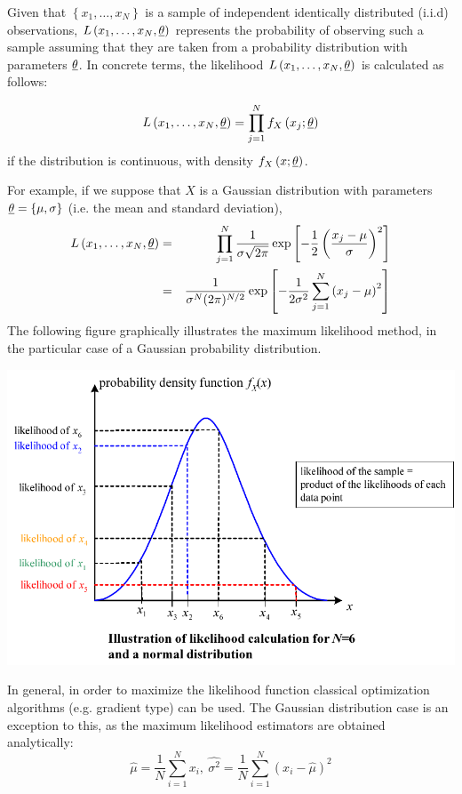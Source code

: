 {  Given that $\left\{x_1,\ldots,x_N \right\}$ is a sample of independent identically distributed (i.i.d) observations, $L\left(x_1,\ldots, x_N, {\underline{\theta}} \right)$ represents the probability of  observing such a sample assuming that they are taken from a probability distribution with parameters ${\underline{\theta}}$. In concrete terms, the likelihood $L\left(x_1,\ldots, x_N, {\underline{\theta}}\right)$ is calculated as follows:
  
  \begin{displaymath}
    L\left(x_1,\ldots, x_N, {\underline{\theta}} \right) = \prod^{N}_{j=1} f_X\left(x_j;{\underline{\theta}} \right)
  \end{displaymath}
  if the distribution is continuous, with density $f_X\left(x;{\underline{\theta}}\right)$. 
  
  For example, if we suppose that $X$ is a Gaussian distribution with parameters ${\underline{\theta}}= \{ \mu,\sigma \}$  (i.e. the mean and standard deviation),
  \begin{eqnarray*}
    L\left(x_1,\ldots, x_N, {\underline{\theta}}\right) &=& \prod^{N}_{j=1} \frac{1}{\sigma \sqrt{2\pi}} \exp \left[ -\frac{1}{2} \left( \frac{x_j-\mu}{\sigma}  \right)^2  \right] \\
    &=& \frac{1}{\sigma^N (2\pi)^{N/2}} \exp \left[ -\frac{1}{2\sigma^2} \sum_{j=1}^N \left( x_j-\mu \right)^2  \right] 
  \end{eqnarray*}
  The following figure graphically illustrates the maximum likelihood method, in the particular case of a Gaussian probability distribution. 
  
  \begin{center}
    \includegraphics[scale=0.8]{MV.pdf}
  \end{center}
  
  In general, in order to maximize the likelihood function classical optimization algorithms (e.g. gradient type) can be used. The Gaussian distribution case is an exception to this, as the maximum likelihood estimators are obtained analytically:
  $$
  \widehat{\mu}  = \frac{1}{N} \sum_{i=1}^N x_i,\ \widehat{\sigma^2} = \frac{1}{N} \sum_{i=1}^N \left( x_i - \widehat{\mu} \right)^2
$$

}
{
}



